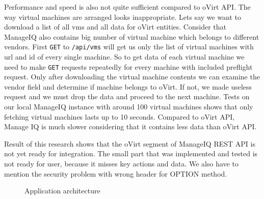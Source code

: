 Performance and speed is also not quite sufficient compared to oVirt API. The way virtual machines are arranged looks inappropriate. Lets say we want to download a list of all vms and all data for oVirt entities. Consider that ManageIQ also contains big number of virtual machine which belongs to different vendors. First \texttt{GET} to \texttt{/api/vms} will get us only the list of virtual machines with url and id of every single machine. So to get data of each virtual machine we need to make \texttt{GET} requests repeatedly for every machine with included preflight request. Only after downloading the virtual machine contents we can examine the vendor field and determine if machine belongs to oVirt. If not, we made useless request and we must drop the data and proceed to the next machine. Tests on our local ManageIQ instance with around 100 virtual machines shows that only fetching virtual machines lasts up to 10 seconds. Compared to oVirt API, Manage IQ is much slower considering that it contains less data than oVirt API.  

Result of this research shows that the oVirt segment of ManageIQ REST API is not yet ready for integration. The small part that was implemented and tested is not ready for user, because it misses key actions and data. We also have to mention the security problem with wrong header for OPTION method.

\begin{figure}[h]
\caption{Application architecture}
\label{app_architecture}
\end{figure}

